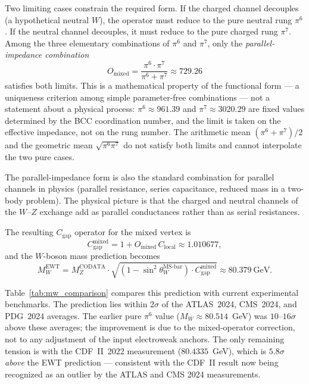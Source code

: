 \documentclass[10pt,a4paper]{article}
\begin{document}
Two limiting cases constrain the required form. If the charged
channel decouples (a hypothetical neutral $W$), the operator must
reduce to the pure neutral rung $\pi^6$. If the neutral channel
decouples, it must reduce to the pure charged rung $\pi^7$. Among the
three elementary combinations of $\pi^6$ and $\pi^7$, only the
\emph{parallel-impedance combination}
\begin{equation}
	O_{\text{mixed}}
	= \frac{\pi^6 \cdot \pi^7}{\pi^6 + \pi^7}
	\approx 729.26
	\label{eq:mixed_operator}
\end{equation}
satisfies both limits. This is a mathematical property of the
functional form --- a uniqueness criterion among simple
parameter-free combinations --- not a statement about a physical
process: $\pi^6 \approx 961.39$ and $\pi^7 \approx 3020.29$ are fixed
values determined by the BCC coordination number, and the limit is
taken on the effective impedance, not on the rung number. The
arithmetic mean $(\pi^6+\pi^7)/2$ and the geometric mean
$\sqrt{\pi^6\pi^7}$ do not satisfy both limits and cannot interpolate
the two pure cases.

The parallel-impedance form is also the standard combination for parallel
channels in physics (parallel resistance, series capacitance, reduced
mass in a two-body problem). The physical picture is that the charged
and neutral channels of the $W$--$Z$ exchange add as parallel
conductances rather than as serial resistances.

The resulting $C_{\text{gap}}$ operator for the mixed vertex is
\begin{equation}
	C_{\text{gap}}^{\text{mixed}}
	= 1 + O_{\text{mixed}} \, C_{\text{local}}
	\approx 1.010677 ,
	\label{eq:cgap_mixed}
\end{equation}
and the $W$-boson mass prediction becomes
\begin{equation}
	\boxed{
		M_W^{\text{EWT}}
		= M_Z^{\text{CODATA}}
		\cdot
		\sqrt{\left(1 - \sin^2\theta_W^{\text{MS-bar}}\right)
			\cdot C_{\text{gap}}^{\text{mixed}}}
		\approx 80.379\ \text{GeV}.
	}
	\label{eq:w_mass_mixed}
\end{equation}

Table~\ref{tab:mw_comparison} compares this prediction with current
experimental benchmarks. The prediction lies within $2\sigma$ of the
ATLAS~2024, CMS~2024, and PDG~2024 averages. The earlier pure $\pi^6$
value ($M_W \approx 80.514$~GeV) was $10$--$16\sigma$ above these
averages; the improvement is due to the mixed-operator correction, not
to any adjustment of the input electroweak anchors. The only remaining
tension is with the CDF~II~2022 measurement ($80.4335$~GeV), which is
$5.8\sigma$ \emph{above} the EWT prediction --- consistent with the
CDF~II result now being recognized as an outlier by the ATLAS and CMS
2024 measurements.
\end{document}

